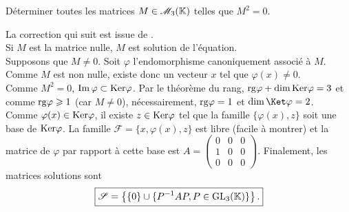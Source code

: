 \begin{tcolorbox}
    Déterminer toutes les matrices $M \in \mathscr{M}_3(\mathbb{K})$ telles que $M^2=0$.
\end{tcolorbox}

La correction qui suit est issue de \cite{ellipses}. \\
Si $M$ est la matrice nulle, $M$ est solution de l'équation. \\
Supposons que $M \not= 0$. Soit $\varphi$ l'endomorphisme canoniquement associé à $M$. \\
Comme $M$ est non nulle, existe donc un vecteur $x$ tel que $\varphi(x) \not= 0$. \\
Comme $M^2 = 0$, $\Im \varphi \subset \mathrm{Ker} \varphi$. Par le théorème du rang, $\mathrm{rg} \varphi + \dim \mathrm{Ker} \varphi = 3$ et comme $\mathrm{rg} \varphi \geqslant 1$ (car $M \not=0$), nécessairement, $\mathrm{rg} \varphi = 1$ et $\dim \Ket \varphi = 2$. \\
Comme $\varphi(x) \in \mathrm{Ker} \varphi$, il existe $z \in \mathrm{Ker} \varphi$ tel que la famille $\{ \varphi(x), z \}$ soit une base de $\mathrm{Ker} \varphi$. La famille $\mathscr{F} = \{x, \varphi(x), z \}$ est libre (facile à montrer) et la matrice de $\varphi$ par rapport à cette base est 
$A = 
\begin{pmatrix}
0 & 0 & 0 \\
1 & 0 & 0 \\ 
0 & 0 & 0
\end{pmatrix}
$. 
Finalement, les matrices solutions sont
$$\boxed{\mathscr{S} = \left \{ \{0\} \cup \{P^{-1} A P, P \in \mathrm{GL}_3(\mathbb{K}) \} \right \}.}$$
